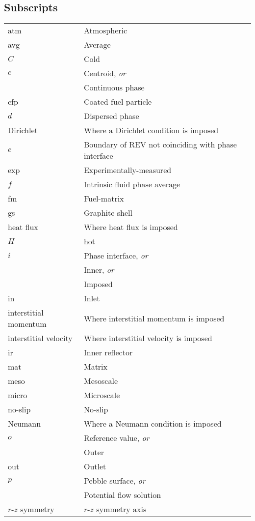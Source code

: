 \subsection*{Subscripts}
\begin{longtable}{p{4cm}p{9cm}p{5cm}}
atm & Atmospheric & \\
avg & Average & \\
\(C\) & Cold & \\
\(c\) & Centroid, \textit{or} &\\
& Continuous phase & \\
cfp & Coated fuel particle & \\
\(d\) & Dispersed phase & \\
Dirichlet & Where a Dirichlet condition is imposed & \\
\(e\) & Boundary of REV not coinciding with phase interface &\\
exp & Experimentally-measured &\\
\(f\) & Intrinsic fluid phase average &\\
fm & Fuel-matrix &\\
gs & Graphite shell & \\
heat flux & Where heat flux is imposed & \\
\(H\) & hot & \\
\(i\) & Phase interface, \textit{or} &\\
& Inner, \textit{or} & \\
& Imposed & \\
in & Inlet & \\
interstitial momentum & Where interstitial momentum is imposed & \\
interstitial velocity & Where interstitial velocity is imposed & \\
ir & Inner reflector & \\
mat & Matrix & \\
meso & Mesoscale & \\
micro & Microscale & \\
no-slip & No-slip & \\
Neumann & Where a Neumann condition is imposed & \\
\(o\) & Reference value, \textit{or} &\\
& Outer & \\
out & Outlet & \\
\(p\) & Pebble surface, \textit{or} & \\
 & Potential flow solution & \\
$r$-$z$ symmetry & $r$-$z$ symmetry axis & \\

\end{longtable}
